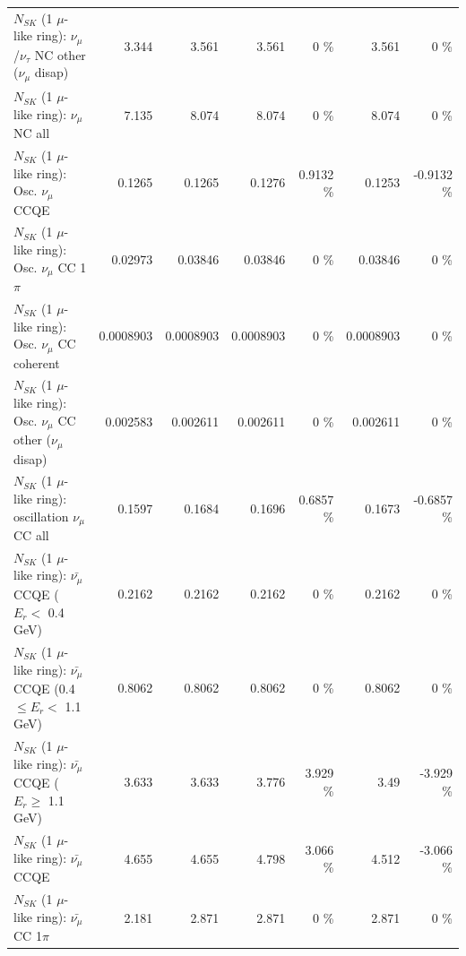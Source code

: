 \begin{table}
\begin{tabular}{| l | r | r | r  r | r  r |}
   $N_{SK}$ (1 $\mu$-like ring): $\nu_\mu$/$\nu_\tau$ NC other ($\nu_\mu$ disap) &           3.344 &           3.561 &           3.561 &        0 \%  &           3.561 &        0 \%  \\ 
                                $N_{SK}$ (1 $\mu$-like ring): $\nu_{\mu}$ NC all &           7.135 &           8.074 &           8.074 &        0 \%  &           8.074 &        0 \%  \\ 
\hline
\hline
                               $N_{SK}$ (1 $\mu$-like ring): Osc. $\nu_\mu$ CCQE &          0.1265 &          0.1265 &          0.1276 &   0.9132 \%  &          0.1253 &  -0.9132 \%  \\ 
                          $N_{SK}$ (1 $\mu$-like ring): Osc. $\nu_\mu$ CC 1$\pi$ &         0.02973 &         0.03846 &         0.03846 &        0 \%  &         0.03846 &        0 \%  \\ 
                        $N_{SK}$ (1 $\mu$-like ring): Osc. $\nu_\mu$ CC coherent &       0.0008903 &       0.0008903 &       0.0008903 &        0 \%  &       0.0008903 &        0 \%  \\ 
         $N_{SK}$ (1 $\mu$-like ring): Osc. $\nu_\mu$ CC other ($\nu_\mu$ disap) &        0.002583 &        0.002611 &        0.002611 &        0 \%  &        0.002611 &        0 \%  \\ 
                      $N_{SK}$ (1 $\mu$-like ring): oscillation $\nu_\mu$ CC all &          0.1597 &          0.1684 &          0.1696 &   0.6857 \%  &          0.1673 &  -0.6857 \%  \\ 
\hline
\hline
          $N_{SK}$ (1 $\mu$-like ring): $\bar{\nu_\mu}$ CCQE ($E_{r} <$ 0.4 GeV) &          0.2162 &          0.2162 &          0.2162 &        0 \%  &          0.2162 &        0 \%  \\ 
 $N_{SK}$ (1 $\mu$-like ring): $\bar{\nu_\mu}$ CCQE (0.4 $\leq E_{r} <$ 1.1 GeV) &          0.8062 &          0.8062 &          0.8062 &        0 \%  &          0.8062 &        0 \%  \\ 
       $N_{SK}$ (1 $\mu$-like ring): $\bar{\nu_\mu}$ CCQE ($E_{r} \geq$ 1.1 GeV) &           3.633 &           3.633 &           3.776 &    3.929 \%  &            3.49 &   -3.929 \%  \\ 
\hline
                              $N_{SK}$ (1 $\mu$-like ring): $\bar{\nu_\mu}$ CCQE &           4.655 &           4.655 &           4.798 &    3.066 \%  &           4.512 &   -3.066 \%  \\ 
                         $N_{SK}$ (1 $\mu$-like ring): $\bar{\nu_\mu}$ CC 1$\pi$ &           2.181 &           2.871 &           2.871 &        0 \%  &           2.871 &        0 \%  \\ 

\end{tabular}
\end{table}
